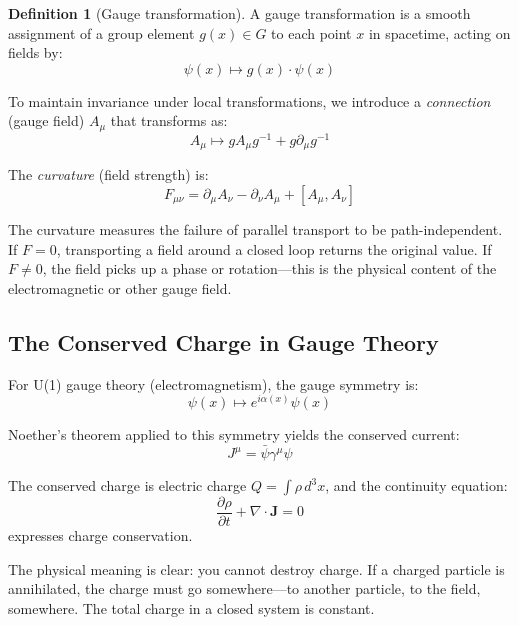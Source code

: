 \documentclass[12pt,letterpaper]{article}
\theoremstyle{definition}
\newtheorem{definition}[theorem]{Definition}
\theoremstyle{remark}
\begin{document}
\begin{definition}[Gauge transformation]
A gauge transformation is a smooth assignment of a group element $g(x) \in G$ to each point $x$ in spacetime, acting on fields by:
\begin{equation}
\psi(x) \mapsto g(x) \cdot \psi(x)
\end{equation}
\end{definition}

To maintain invariance under local transformations, we introduce a \textit{connection} (gauge field) $A_\mu$ that transforms as:
\begin{equation}
A_\mu \mapsto g A_\mu g^{-1} + g \partial_\mu g^{-1}
\end{equation}

The \textit{curvature} (field strength) is:
\begin{equation}
F_{\mu\nu} = \partial_\mu A_\nu - \partial_\nu A_\mu + [A_\mu, A_\nu]
\end{equation}

The curvature measures the failure of parallel transport to be path-independent. If $F = 0$, transporting a field around a closed loop returns the original value. If $F \neq 0$, the field picks up a phase or rotation---this is the physical content of the electromagnetic or other gauge field.

\subsection{The Conserved Charge in Gauge Theory}

For U(1) gauge theory (electromagnetism), the gauge symmetry is:
\begin{equation}
\psi(x) \mapsto e^{i\alpha(x)} \psi(x)
\end{equation}

Noether's theorem applied to this symmetry yields the conserved current:
\begin{equation}
J^\mu = \bar{\psi} \gamma^\mu \psi
\end{equation}

The conserved charge is electric charge $Q = \int \rho \, d^3x$, and the continuity equation:
\begin{equation}
\frac{\partial \rho}{\partial t} + \nabla \cdot \mathbf{J} = 0
\end{equation}
expresses charge conservation.

The physical meaning is clear: you cannot destroy charge. If a charged particle is annihilated, the charge must go somewhere---to another particle, to the field, somewhere. The total charge in a closed system is constant.
\end{document}
